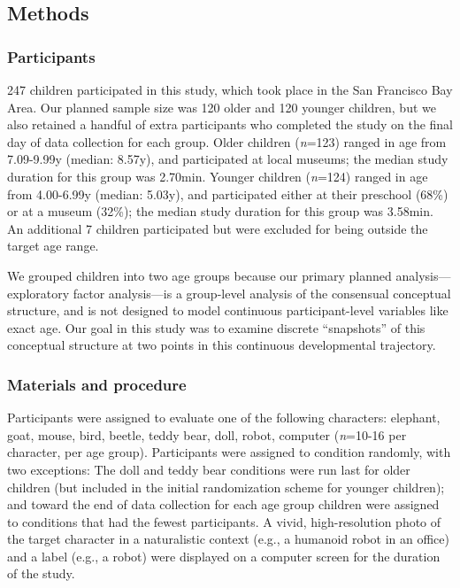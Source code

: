 \documentclass[10pt, letterpaper]{article}
\begin{document}
\subsection{Methods}\label{methods}

\subsubsection{Participants}\label{participants}

247 children participated in this study, which took place in the San
Francisco Bay Area. Our planned sample size was 120 older and 120
younger children, but we also retained a handful of extra participants
who completed the study on the final day of data collection for each
group. Older children (\emph{n}=123) ranged in age from 7.09-9.99y
(median: 8.57y), and participated at local museums; the median study
duration for this group was 2.70min. Younger children (\emph{n}=124)
ranged in age from 4.00-6.99y (median: 5.03y), and participated either
at their preschool (68\%) or at a museum (32\%); the median study
duration for this group was 3.58min. An additional 7 children
participated but were excluded for being outside the target age range.

We grouped children into two age groups because our primary planned
analysis---exploratory factor analysis---is a group-level analysis of
the consensual conceptual structure, and is not designed to model
continuous participant-level variables like exact age. Our goal in this
study was to examine discrete ``snapshots'' of this conceptual structure
at two points in this continuous developmental trajectory.

\subsubsection{Materials and procedure}\label{materials-and-procedure}

Participants were assigned to evaluate one of the following characters:
elephant, goat, mouse, bird, beetle, teddy bear, doll, robot, computer
(\emph{n}=10-16 per character, per age group). Participants were
assigned to condition randomly, with two exceptions: The doll and teddy
bear conditions were run last for older children (but included in the
initial randomization scheme for younger children); and toward the end
of data collection for each age group children were assigned to
conditions that had the fewest participants. A vivid, high-resolution
photo of the target character in a naturalistic context (e.g., a
humanoid robot in an office) and a label (e.g., a robot) were displayed
on a computer screen for the duration of the study.
\end{document}
